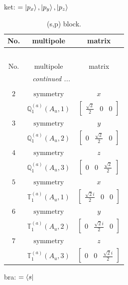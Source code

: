 \documentclass[fleqn,8pt,landscape]{jsarticle}
\begin{document}
\noindent
ket: $=\ket{p_{x}}, \ket{p_{y}}, \ket{p_{z}}$
\renewcommand{\arraystretch}{1.6}
\begin{longtable}{ccc}
\caption{(s,p) block.}
 \\
 \hline \hline
No. & multipole & matrix \\ \hline \endfirsthead

\multicolumn{2}{l}{\tablename\ \thetable{}} \\
 \hline \hline
No. & multipole & matrix \\ \hline \endhead

 \hline \hline
\multicolumn{2}{r}{\footnotesize\it continued ...} \\ \endfoot

 \hline \hline
\multicolumn{2}{r}{} \\ \endlastfoot

$ 2 $ & $ \text{symmetry} $ & $ x $ \\
$  $ & $ \mathbb{Q}_{1}^{(a)}(A_{u},1) $ & $ \begin{bmatrix} \frac{\sqrt{2}}{2} & 0 & 0 \end{bmatrix} $ \\ \hline
$ 3 $ & $ \text{symmetry} $ & $ y $ \\
$  $ & $ \mathbb{Q}_{1}^{(a)}(A_{u},2) $ & $ \begin{bmatrix} 0 & \frac{\sqrt{2}}{2} & 0 \end{bmatrix} $ \\ \hline
$ 4 $ & $ \text{symmetry} $ & $ z $ \\
$  $ & $ \mathbb{Q}_{1}^{(a)}(A_{u},3) $ & $ \begin{bmatrix} 0 & 0 & \frac{\sqrt{2}}{2} \end{bmatrix} $ \\ \hline
$ 5 $ & $ \text{symmetry} $ & $ x $ \\
$  $ & $ \mathbb{T}_{1}^{(a)}(A_{u},1) $ & $ \begin{bmatrix} \frac{\sqrt{2} i}{2} & 0 & 0 \end{bmatrix} $ \\ \hline
$ 6 $ & $ \text{symmetry} $ & $ y $ \\
$  $ & $ \mathbb{T}_{1}^{(a)}(A_{u},2) $ & $ \begin{bmatrix} 0 & \frac{\sqrt{2} i}{2} & 0 \end{bmatrix} $ \\ \hline
$ 7 $ & $ \text{symmetry} $ & $ z $ \\
$  $ & $ \mathbb{T}_{1}^{(a)}(A_{u},3) $ & $ \begin{bmatrix} 0 & 0 & \frac{\sqrt{2} i}{2} \end{bmatrix} $ \\ \hline
\end{longtable}
bra: $=\bra{s}$
\end{document}
